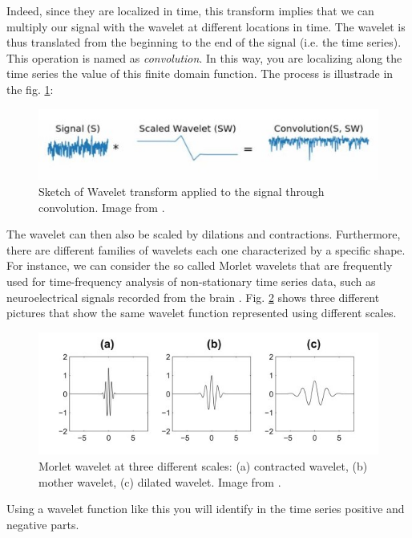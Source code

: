 \documentclass[12pt,a4paper]{report}
\begin{document}
Indeed, since they are localized in time, this transform implies that we can multiply our signal with the wavelet at different locations in time. The wavelet is thus translated from the beginning to the end of the signal (i.e. the time series). This operation is named as \emph{convolution}. In this way, you are localizing along the time series the value of this finite domain function. The process is illustrade in the fig. \ref{exampleofconvolution}:

\begin{figure}[!ht]
\centering
\includegraphics[scale=0.80]{exampleofconvolution.jpg}
\caption{Sketch of Wavelet transform applied to the signal through convolution. Image from \cite{WaveletsTutorial}.}
\label{exampleofconvolution}
\end{figure}
The wavelet can then also be scaled by dilations and contractions. Furthermore, there are different families of wavelets each one characterized by a specific shape. For instance, we can consider the so called Morlet wavelets that are frequently used for time-frequency analysis of non-stationary time series data, such as neuroelectrical signals recorded from the brain \cite{Neuroscience}. Fig. \ref{Morlet} shows three different pictures that show the same wavelet function represented using different scales.

\begin{figure}[!ht]
\centering
\includegraphics[scale=0.80]{Morlet.jpg}
\caption{Morlet wavelet at three different scales: (a) contracted wavelet, (b) mother wavelet, (c) dilated wavelet. Image from \cite{ScienceDirectMorlet}.}
\label{Morlet}
\end{figure}
Using a wavelet function like this you will identify in the time series positive and negative parts.
\end{document}
